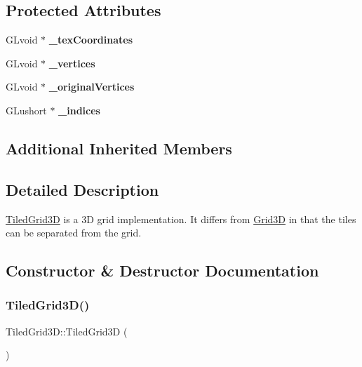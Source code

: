 \subsection*{Protected Attributes}
\begin{DoxyCompactItemize}
\item 
\mbox{\label{classTiledGrid3D_a4fc64b75ccc25ceb9d8c7470c5cb18d7}} 
G\+Lvoid $\ast$ {\bfseries \+\_\+tex\+Coordinates}
\item 
\mbox{\label{classTiledGrid3D_acea8fdf6654909bd79667285a8768a3e}} 
G\+Lvoid $\ast$ {\bfseries \+\_\+vertices}
\item 
\mbox{\label{classTiledGrid3D_a2e0aded458e75bc67a97c2b0dd4ac394}} 
G\+Lvoid $\ast$ {\bfseries \+\_\+original\+Vertices}
\item 
\mbox{\label{classTiledGrid3D_aac0b245a0f22e8dfee5b94196e8112b7}} 
G\+Lushort $\ast$ {\bfseries \+\_\+indices}
\end{DoxyCompactItemize}
\subsection*{Additional Inherited Members}


\subsection{Detailed Description}
\hyperlink{classTiledGrid3D}{Tiled\+Grid3D} is a 3D grid implementation. It differs from \hyperlink{classGrid3D}{Grid3D} in that the tiles can be separated from the grid. 

\subsection{Constructor \& Destructor Documentation}
\mbox{\label{classTiledGrid3D_a0e8af3f438981892b1c2e2e4da6a8f2b}} 
\subsubsection{\texorpdfstring{Tiled\+Grid3\+D()}{TiledGrid3D()}\hspace{0.1cm}{\footnotesize\ttfamily [1/2]}}
{\footnotesize\ttfamily Tiled\+Grid3\+D\+::\+Tiled\+Grid3D (\begin{DoxyParamCaption}{ }\end{DoxyParamCaption})}


